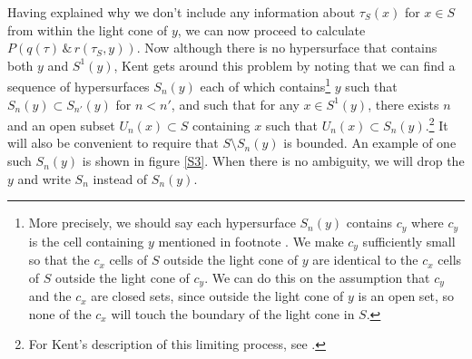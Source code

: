 Having explained why we don't include any information about $\tau_S(x)$ for $x\in S$ from within the light cone of $y$, we can now proceed to calculate  $P(q(\tau) \, \&\,  r(\tau_S,y))$. Now although there is no hypersurface that contains both $y$ and $S^1(y)$, Kent gets around this problem by noting that we can find a sequence of hypersurfaces $S_n(y)$ each  %
%
 of which contains\footnote{More precisely, we should say each hypersurface $S_n(y)$ contains $c_y$ where $c_y$ is the cell containing $y$ mentioned in footnote . We make $c_y$ sufficiently small so that the $c_x$ cells of $S$ outside the light cone of $y$ are identical to the $c_x$ cells of $S$ outside the light cone of $c_y$. We can do this on the assumption that $c_y$ and the $c_x$ are closed sets, since outside the light cone of $y$ is an open set, so none of the $c_x$ will touch the boundary of the light cone in $S$. } $y$ such that\label{siydef} $S_n(y)\subset S_{n'}(y)$ for $n<n'$, and such that for any $x\in S^1(y)$, there exists $n$ and an open subset $U_n(x)\subset S$ containing $x$ such that $U_n(x)\subset S_n(y)$.\footnote{For Kent's description of this limiting process, see \cite[2]{Kent2014}.} It will also be convenient to require that $S\setminus S_n(y)$ is bounded. An example of one such $S_n(y)$ is shown in figure \ref{S3}. When there is no ambiguity,  %
 we will drop the $y$ and write $S_n$ instead of $S_n(y)$. 
